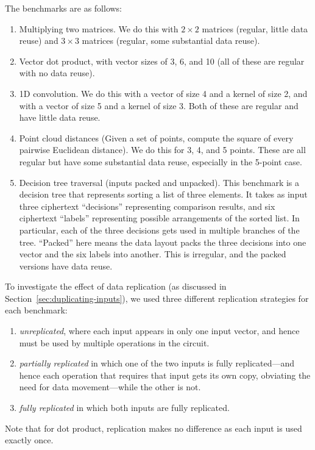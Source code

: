 The benchmarks are as follows:
\begin{enumerate}[label=\arabic*.]
    \item Multiplying two matrices. We do this with $2\times 2$ matrices (regular, little data reuse) and $3\times 3$ matrices (regular, some substantial data reuse). %
    \item Vector dot product, with vector sizes of 3, 6, and 10 (all of these are regular with no data reuse).
    \item 1D convolution. We do this with a vector of size 4 and a kernel of size 2, and with a vector of size 5 and a kernel of size 3. Both of these are regular and have little data reuse.
    \item Point cloud distances (Given a set of points, compute the square of every pairwise Euclidean distance). We do this for 3, 4, and 5 points. These are all regular but have some substantial data reuse, especially in the 5-point case.
    \item Decision tree traversal (inputs packed and unpacked). This benchmark is a decision tree that represents sorting a list of three elements. It takes as input three ciphertext ``decisions'' representing comparison results, and six ciphertext ``labels'' representing possible arrangements of the sorted list. In particular, each of the three decisions gets used in multiple branches of the tree. ``Packed'' here means the data layout packs the three decisions into one vector and the six labels into another. This is irregular, and the packed versions have data reuse.
\end{enumerate}


To investigate the effect of data replication (as discussed in Section~\ref{sec:duplicating-inputs}), we used three different replication strategies for each benchmark: 

\begin{enumerate}[label=(\roman*)]
\item {\em unreplicated}, where each input appears in only one input vector, and hence must be used by multiple operations in the circuit.
\item {\em partially replicated} in which one of the two inputs is fully replicated---and hence each operation that requires that input gets its own copy, obviating the need for data movement---while the other is not.
\item {\em fully replicated} in which both inputs are fully replicated. 
\end{enumerate}
Note that for dot product, replication makes no difference as each input is used exactly once.

